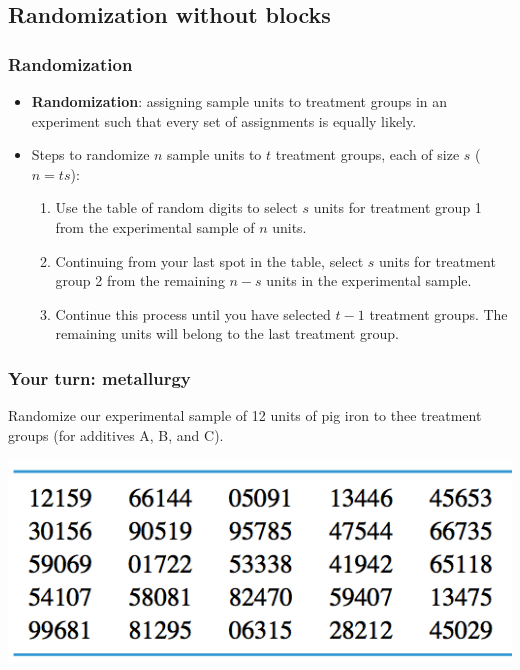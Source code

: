 \documentclass[handout]{beamer}\usepackage{graphicx, color}
\numberwithin{equation}{section}
\begin{document}
\subsection{Randomization without blocks}


\begin{frame}
\frametitle{Randomization}

\begin{itemize}
\item {\bf Randomization}: assigning sample units to treatment groups in an experiment such that every set of assignments is equally likely.
\pause \item Steps to randomize $n$ sample units to $t$ treatment groups, each of size $s$ ($n = ts$):
\begin{enumerate}[1. ]
\pause \item Use the table of random digits to select $s$ units for treatment group 1 from the experimental sample of $n$ units.
\pause \item Continuing from your last spot in the table, select $s$ units for treatment group 2 from the remaining $n - s$ units in the experimental sample.
\pause \item Continue this process until you have selected $t - 1$ treatment groups. The remaining units will belong to the last treatment group.
\end{enumerate}
\end{itemize}
\end{frame}


\begin{frame}
\frametitle{Your turn: metallurgy}

Randomize our experimental sample of 12 units of pig iron to thee treatment groups (for additives A, B, and C).

\begin{center}
 \includegraphics{../../fig/rdigitsshort.png}
\end{center}

\end{frame}
\end{document}
